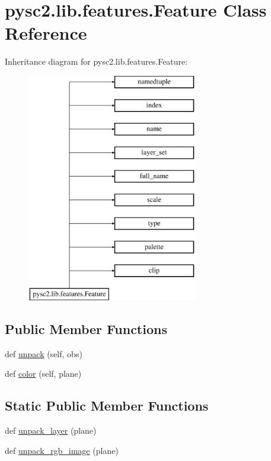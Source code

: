 \hypertarget{classpysc2_1_1lib_1_1features_1_1_feature}{}\section{pysc2.\+lib.\+features.\+Feature Class Reference}
\label{classpysc2_1_1lib_1_1features_1_1_feature}
Inheritance diagram for pysc2.\+lib.\+features.\+Feature\+:\begin{figure}[H]
\begin{center}
\leavevmode
\includegraphics[height=10.000000cm]{classpysc2_1_1lib_1_1features_1_1_feature}
\end{center}
\end{figure}
\subsection*{Public Member Functions}
\begin{DoxyCompactItemize}
\item 
def \mbox{\hyperlink{classpysc2_1_1lib_1_1features_1_1_feature_a840859c8cc0f2bc3c80b665a38e879d7}{unpack}} (self, obs)
\item 
def \mbox{\hyperlink{classpysc2_1_1lib_1_1features_1_1_feature_a08f6ecbdfc49803c7221b5948d91df9e}{color}} (self, plane)
\end{DoxyCompactItemize}
\subsection*{Static Public Member Functions}
\begin{DoxyCompactItemize}
\item 
def \mbox{\hyperlink{classpysc2_1_1lib_1_1features_1_1_feature_ae2deeb3c743654425193f0b225c388e8}{unpack\+\_\+layer}} (plane)
\item 
def \mbox{\hyperlink{classpysc2_1_1lib_1_1features_1_1_feature_addc5dd18d59ef32762876df736f4509d}{unpack\+\_\+rgb\+\_\+image}} (plane)
\end{DoxyCompactItemize}
